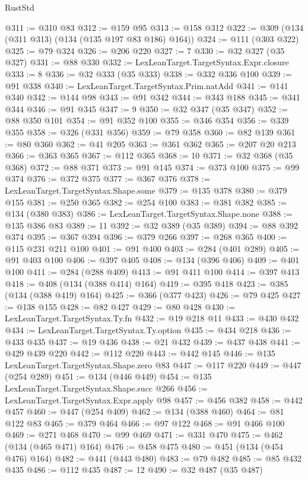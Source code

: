 \begin{lexlean}{RustStd}
\begin{coremodule}
{\begin{coremodule}
{{{{{{{{{{{{{{{{{{{{{{{{{{{{{{{{@311 := @310 @83
@312 := @159 @95
@313 := @158 @312
@322 := @309 (@134 (@311 @313) (@134 (@135 @197 @83 @186) @164))
@324 := @111 (@303 @322)
@325 := @79 @324
@326 := @206 @220
@327 := 7
@330 := @32 @327 (@35 @327)
@331 := @88 @330
@332 := LexLeanTarget.TargetSyntax.Expr.closure
@333 := 8
@336 := @32 @333 (@35 @333)
@338 := @332 @336 @100
@339 := @91 @338
@340 := LexLeanTarget.TargetSyntax.Prim.natAdd
@341 := @141 @340
@342 := @144 @98
@343 := @91 @342
@344 := @343 @188
@345 := @341 @344
@346 := @91 @345
@347 := 9
@350 := @32 @347 (@35 @347)
@352 := @88 @350 @101
@354 := @91 @352 @100
@355 := @346 @354
@356 := @339 @355
@358 := @326 (@331 @356)
@359 := @79 @358
@360 := @82 @139
@361 := @80 @360
@362 := @41 @205
@363 := @361 @362
@365 := @207 @20 @213
@366 := @363 @365
@367 := @112 @365
@368 := 10
@371 := @32 @368 (@35 @368)
@372 := @88 @371
@373 := @91 @145
@374 := @373 @100
@375 := @99 @374
@376 := @372 @375
@377 := @367 @376
@378 := LexLeanTarget.TargetSyntax.Shape.some
@379 := @135 @378
@380 := @379 @155
@381 := @250 @365
@382 := @254 @100
@383 := @381 @382
@385 := @134 (@380 @383)
@386 := LexLeanTarget.TargetSyntax.Shape.none
@388 := @135 @386 @83
@389 := 11
@392 := @32 @389 (@35 @389)
@394 := @88 @392 @374
@395 := @367 @394
@396 := @379 @266
@397 := @268 @365
@400 := @115 @231 @211 @100
@401 := @91 @400
@403 := @284 (@401 @289)
@405 := @91 @403 @100
@406 := @397 @405
@408 := @134 (@396 @406)
@409 := @401 @100
@411 := @284 (@288 @409)
@413 := @91 @411 @100
@414 := @397 @413
@418 := @408 (@134 (@388 @414) @164)
@419 := @395 @418
@423 := @385 (@134 (@388 @419) @164)
@425 := @366 (@377 @423)
@426 := @79 @425
@427 := @138 @155
@428 := @82 @427
@429 := @80 @428
@430 := LexLeanTarget.TargetSyntax.Ty.fn
@432 := @19 @218 @11
@433 := @430 @432
@434 := LexLeanTarget.TargetSyntax.Ty.option
@435 := @434 @218
@436 := @433 @435
@437 := @19 @436
@438 := @21 @432
@439 := @437 @438
@441 := @429 @439 @220
@442 := @112 @220
@443 := @442 @145
@446 := @135 LexLeanTarget.TargetSyntax.Shape.zero @83
@447 := @117 @220
@449 := @447 (@254 @289)
@451 := @134 (@446 @449)
@454 := @135 LexLeanTarget.TargetSyntax.Shape.succ @266
@456 := LexLeanTarget.TargetSyntax.Expr.apply @98
@457 := @456 @382
@458 := @442 @457
@460 := @447 (@254 @409)
@462 := @134 (@388 @460)
@464 := @81 @122 @83
@465 := @379 @464
@466 := @97 @122
@468 := @91 @466 @100
@469 := @271 @468
@470 := @99 @469
@471 := @331 @470
@475 := @462 (@134 (@465 @471) @164)
@476 := @458 @475
@480 := @451 (@134 (@454 @476) @164)
@482 := @441 (@443 @480)
@483 := @79 @482
@485 := @85 @432 @435
@486 := @112 @435
@487 := 12
@490 := @32 @487 (@35 @487)
}}}}}}}}}}}}}}}}}}}}}}}}}}}}}}}}
\end{coremodule}}
\end{coremodule}
\end{lexlean}

